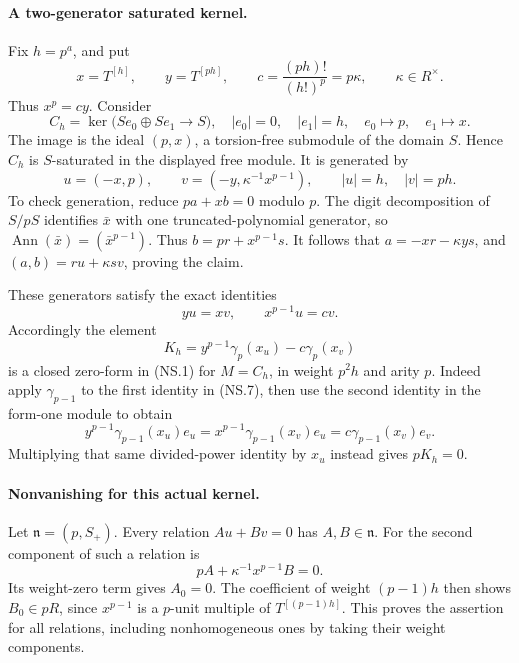 \paragraph{A two-generator saturated kernel.}
Fix \(h=p^a\), and put
\[
 x=T^{[h]},\qquad y=T^{[ph]},\qquad
 c=\frac{(ph)!}{(h!)^p}=p\kappa,\qquad \kappa\in R^\times.
                                                               \tag{NS.4}
\]
Thus \(x^p=cy\). Consider
\[
 C_h=\ker\bigl(S e_0\oplus S e_1\longrightarrow S\bigr),
 \quad |e_0|=0,\quad |e_1|=h,
 \quad e_0\mapsto p,\quad e_1\mapsto x.
                                                               \tag{NS.5}
\]
The image is the ideal \((p,x)\), a torsion-free submodule
of the domain \(S\). Hence \(C_h\) is \(S\)-saturated in
the displayed free module. It is generated by
\[
        u=(-x,p),\qquad
        v=(-y,\kappa^{-1}x^{p-1}),
        \qquad |u|=h,\quad |v|=ph.                     \tag{NS.6}
\]
To check generation, reduce \(p a+x b=0\) modulo \(p\).
The digit decomposition of \(S/pS\) identifies \(\bar x\)
with one truncated-polynomial generator, so
\(\operatorname{Ann}(\bar x)=(\bar x^{p-1})\).
Thus \(b=p r+x^{p-1}s\). It follows that
\(a=-xr-\kappa y s\), and
\((a,b)=r u+\kappa s v\), proving the claim.

These generators satisfy the exact identities
\[
                     yu=xv,\qquad x^{p-1}u=cv .          \tag{NS.7}
\]
Accordingly the element
\[
                  K_h=y^{p-1}\gamma_p(x_u)
                                  -c\gamma_p(x_v)       \tag{NS.8}
\]
is a closed zero-form in (NS.1) for \(M=C_h\), in weight
\(p^2h\) and arity \(p\). Indeed apply \(\gamma_{p-1}\)
to the first identity in (NS.7), then use the second identity
in the form-one module to obtain
\[
 y^{p-1}\gamma_{p-1}(x_u)e_u
   =x^{p-1}\gamma_{p-1}(x_v)e_u
   =c\gamma_{p-1}(x_v)e_v.
\]
Multiplying that same divided-power identity by \(x_u\)
instead gives \(pK_h=0\).

\paragraph{Nonvanishing for this actual kernel.}
Let \(\mathfrak n=(p,S_+)\). Every relation
\(A u+B v=0\) has \(A,B\in\mathfrak n\).
For the second component of such a relation is
\[
                    pA+\kappa^{-1}x^{p-1}B=0.
\]
Its weight-zero term gives \(A_0=0\). The coefficient of
weight \((p-1)h\) then shows \(B_0\in pR\), since
\(x^{p-1}\) is a \(p\)-unit multiple of
\(T^{[(p-1)h]}\). This proves the assertion for all relations,
including nonhomogeneous ones by taking their weight components.

